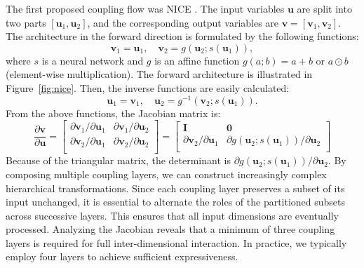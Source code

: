 The first proposed coupling flow was \ac{NICE} \citep{dinh2015nice}. The input variables $\boldsymbol{u}$ are split into two parts $[\boldsymbol{u}_1, \boldsymbol{u}_2]$, and the corresponding output variables are $\boldsymbol{v} = [\boldsymbol{v}_1, \boldsymbol{v}_2]$. The architecture in the forward direction is formulated by the following functions:
\begin{equation}
    \boldsymbol{v}_1 = \boldsymbol{u}_1, \quad \boldsymbol{v}_2 = g(\boldsymbol{u}_2;s(\boldsymbol{u}_1)),
\end{equation}
where $s$ is a neural network and $g$ is an affine function $g(a;b)=a+b$ or $a\odot b$ (element-wise multiplication). The forward architecture is illustrated in Figure~\ref{fig:nice}.
Then, the inverse functions are easily calculated:
\begin{equation}
    \boldsymbol{u}_1 = \boldsymbol{v}_1,\quad \boldsymbol{u}_2 = g^{-1}(\boldsymbol{v}_2;s(\boldsymbol{u}_1)).
\end{equation}
From the above functions, the Jacobian matrix is:
\begin{equation}\label{eq:background:nice}
\frac {\partial \boldsymbol{v}}{\partial \boldsymbol{u}}=\begin{bmatrix}
\partial \boldsymbol{v}_1/\partial \boldsymbol{u}_1 & \partial \boldsymbol{v}_1/\partial \boldsymbol{u}_2 \\
\partial \boldsymbol{v}_2/\partial \boldsymbol{u}_1 & \partial \boldsymbol{v}_2/\partial \boldsymbol{u}_2\\
\end{bmatrix}=\begin{bmatrix}
\boldsymbol{I} & \boldsymbol{0} \\
\partial \boldsymbol{v}_2/\partial \boldsymbol{u}_1 & \partial g(\boldsymbol{u}_2;s(\boldsymbol{u}_1))/\partial \boldsymbol{u}_2\\
\end{bmatrix}
\end{equation}
Because of the triangular matrix, the determinant is $ \partial g(\boldsymbol{u}_2;s(\boldsymbol{u}_1))/\partial \boldsymbol{u}_2$.
By composing multiple coupling layers, we can construct increasingly complex hierarchical transformations. Since each coupling layer preserves a subset of its input unchanged, it is essential to alternate the roles of the partitioned subsets across successive layers. This ensures that all input dimensions are eventually processed. Analyzing the Jacobian reveals that a minimum of three coupling layers is required for full inter-dimensional interaction. In practice, we typically employ four layers to achieve sufficient expressiveness.

